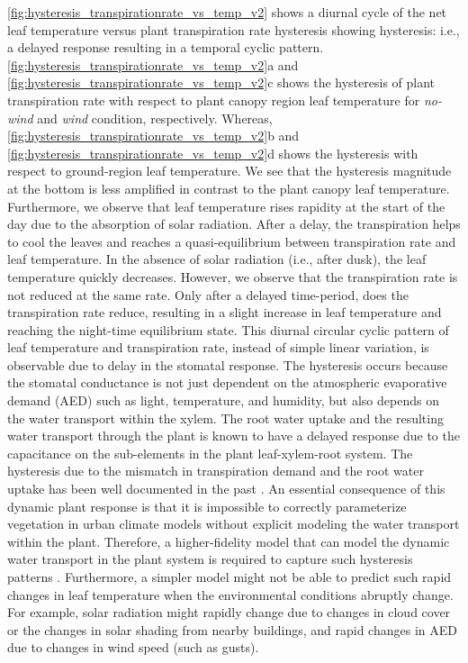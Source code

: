 \cref{fig:hysteresis_transpirationrate_vs_temp_v2} shows a diurnal cycle of the net leaf temperature versus plant transpiration rate hysteresis showing hysteresis: i.e., a delayed response resulting in a temporal cyclic pattern. \cref{fig:hysteresis_transpirationrate_vs_temp_v2}a and \cref{fig:hysteresis_transpirationrate_vs_temp_v2}c shows the hysteresis of plant transpiration rate with respect to plant canopy region leaf temperature for \textit{no-wind} and \textit{wind} condition, respectively. Whereas, \cref{fig:hysteresis_transpirationrate_vs_temp_v2}b and \cref{fig:hysteresis_transpirationrate_vs_temp_v2}d shows the hysteresis with respect to ground-region leaf temperature. We see that the hysteresis magnitude at the bottom is less amplified in contrast to the plant canopy leaf temperature. Furthermore, we observe that leaf temperature rises rapidity at the start of the day due to the absorption of solar radiation. After a delay, the transpiration helps to cool the leaves and reaches a quasi-equilibrium between transpiration rate and leaf temperature. In the absence of solar radiation (i.e., after dusk), the leaf temperature quickly decreases. However, we observe that the transpiration rate is not reduced at the same rate. Only after a delayed time-period, does the transpiration rate reduce, resulting in a slight increase in leaf temperature and reaching the night-time equilibrium state. This diurnal circular cyclic pattern of leaf temperature and transpiration rate, instead of simple linear variation, is observable due to delay in the stomatal response. The hysteresis occurs because the stomatal conductance is not just dependent on the atmospheric evaporative demand (AED) such as light, temperature, and humidity, but also depends on the water transport within the xylem. The root water uptake and the resulting water transport through the plant is known to have a delayed response due to the capacitance on the sub-elements in the plant leaf-xylem-root system. The hysteresis due to the mismatch in transpiration demand and the root water uptake has been well documented in the past \citep{Dauzat2001, Williams1996}. An essential consequence of this dynamic plant response is that it is impossible to correctly parameterize vegetation in urban climate models without explicit modeling the water transport within the plant. Therefore, a higher-fidelity model that can model the dynamic water transport in the plant system is required to capture such hysteresis patterns \citep{Huang2017, Manzoni2011}. Furthermore, a simpler model might not be able to predict such rapid changes in leaf temperature when the environmental conditions abruptly change. For example, solar radiation might rapidly change due to changes in cloud cover or the changes in solar shading from nearby buildings, and rapid changes in AED due to changes in wind speed (such as gusts).     

